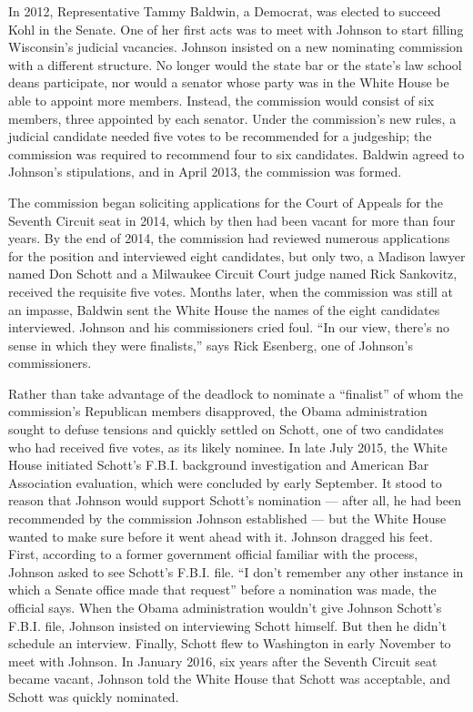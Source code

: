 In 2012, Representative Tammy Baldwin, a Democrat, was elected to
succeed Kohl in the Senate. One of her first acts was to meet with
Johnson to start filling Wisconsin's judicial vacancies. Johnson
insisted on a new nominating commission with a different structure. No
longer would the state bar or the state's law school deans participate,
nor would a senator whose party was in the White House be able to
appoint more members. Instead, the commission would consist of six
members, three appointed by each senator. Under the commission's new
rules, a judicial candidate needed five votes to be recommended for a
judgeship; the commission was required to recommend four to six
candidates. Baldwin agreed to Johnson's stipulations, and in April 2013,
the commission was formed.

The commission began soliciting applications for the Court of Appeals
for the Seventh Circuit seat in 2014, which by then had been vacant for
more than four years. By the end of 2014, the commission had reviewed
numerous applications for the position and interviewed eight candidates,
but only two, a Madison lawyer named Don Schott and a Milwaukee Circuit
Court judge named Rick Sankovitz, received the requisite five votes.
Months later, when the commission was still at an impasse, Baldwin sent
the White House the names of the eight candidates interviewed. Johnson
and his commissioners cried foul. ``In our view, there's no sense in
which they were finalists,'' says Rick Esenberg, one of Johnson's
commissioners.

Rather than take advantage of the deadlock to nominate a ``finalist'' of
whom the commission's Republican members disapproved, the Obama
administration sought to defuse tensions and quickly settled on Schott,
one of two candidates who had received five votes, as its likely
nominee. In late July 2015, the White House initiated Schott's F.B.I.
background investigation and American Bar Association evaluation, which
were concluded by early September. It stood to reason that Johnson would
support Schott's nomination --- after all, he had been recommended by
the commission Johnson established --- but the White House wanted to
make sure before it went ahead with it. Johnson dragged his feet. First,
according to a former government official familiar with the process,
Johnson asked to see Schott's F.B.I. file. ``I don't remember any other
instance in which a Senate office made that request'' before a
nomination was made, the official says. When the Obama administration
wouldn't give Johnson Schott's F.B.I. file, Johnson insisted on
interviewing Schott himself. But then he didn't schedule an interview.
Finally, Schott flew to Washington in early November to meet with
Johnson. In January 2016, six years after the Seventh Circuit seat
became vacant, Johnson told the White House that Schott was acceptable,
and Schott was quickly nominated.

